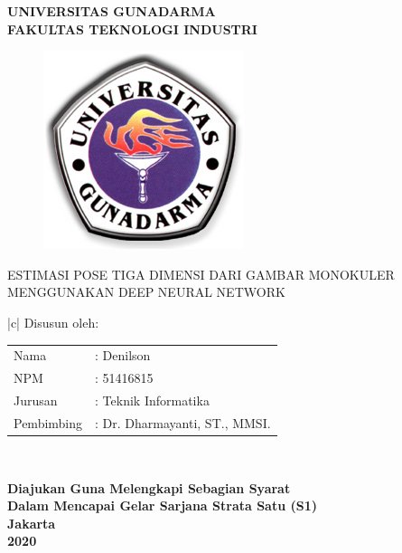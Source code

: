 \newpage


\begin{center}
  \bfseries
  {\large UNIVERSITAS GUNADARMA}\\
  {\large FAKULTAS TEKNOLOGI INDUSTRI}\\

  \vspace{1.5cm}

  \begin{figure}[h]
    \begin{center}
      \includegraphics[scale=4.5]{gambar/LogoGunadarma.jpg}
    \end{center}
  \end{figure}

  \vspace{1.0cm}

  {\large ESTIMASI POSE TIGA DIMENSI DARI GAMBAR MONOKULER MENGGUNAKAN DEEP NEURAL NETWORK}

  \vspace{2.0cm}

  \begin{tabular}{|c|}
    \hline
    Disusun oleh:             \\
    \begin{tabular}{ll}
      Nama       & : Denilson                    \\[-5pt]
      NPM        & : 51416815                    \\[-5pt]
      Jurusan    & : Teknik Informatika          \\[-5pt]
      Pembimbing & : Dr. Dharmayanti, ST., MMSI. \\
    \end{tabular} \\
    \hline
  \end{tabular}

\end{center}

\vspace{1.5cm}

\begin{center}
  \bfseries
  Diajukan Guna Melengkapi Sebagian Syarat \\
  Dalam Mencapai Gelar Sarjana Strata Satu (S1)\\

  Jakarta\\
  2020 %
\end{center}
